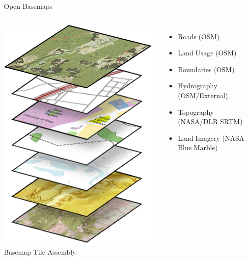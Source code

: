 \documentclass{beamer}
\begin{document}
\begin{frame}{Open Basemaps}
 \begin{columns}
   \linebreak
   \linebreak
   \includegraphics[scale=0.5]{images/basemap_layers}
   Basemap Tile Assembly:
   \vspace{0.6em}
   \begin{itemize}
    \itemsep 0.65em
    \item Roads (OSM)
    \item Land Usage (OSM)
    \item Boundaries (OSM)
    \item Hydrography (OSM/External)
    \item Topography (NASA/DLR SRTM)
    \item Land Imagery (NASA Blue Marble)
   \end{itemize}
   \linebreak
 \end{columns}
\end{frame}
\end{document}
